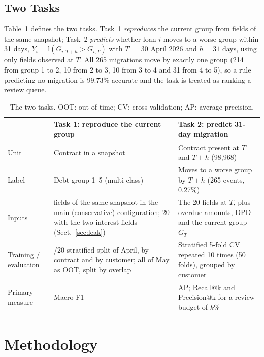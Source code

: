 \documentclass[runningheads]{llncs}
\begin{document}
\subsection{Two Tasks}

Table~\ref{tab:tasks} defines the two tasks. Task~1 \emph{reproduces} the current group from fields of the same snapshot; Task~2 \emph{predicts} whether loan $i$ moves to a worse group within 31 days, $Y_i=\mathbb{I}(G_{i,T+h}>G_{i,T})$ with $T=$ 30 April 2026 and $h=31$ days, using only fields observed at $T$. All 265 migrations move by exactly one group (214 from group 1 to 2, 10 from 2 to 3, 10 from 3 to 4 and 31 from 4 to 5), so a rule predicting no migration is 99.73\% accurate and the task is treated as ranking a review queue.

\begin{table}[t]
\centering
\caption{The two tasks. OOT: out-of-time; CV: cross-validation; AP: average precision.}
\label{tab:tasks}
\scriptsize
\begin{tabular}{@{}>{\raggedright\arraybackslash}p{1.7cm}>{\raggedright\arraybackslash}p{4.6cm}>{\raggedright\arraybackslash}p{5.3cm}@{}}
\toprule
& Task 1: reproduce the current group & Task 2: predict 31-day migration\\
\midrule
Unit & Contract in a snapshot & Contract present at $T$ and $T+h$ (98,968)\\
Label & Debt group 1--5 (multi-class) & Moves to a worse group by $T+h$ (265 events, 0.27\%)\\
Inputs & 18 fields of the same snapshot in the main (conservative) configuration; 20 with the two interest fields (Sect.~\ref{sec:leak}) & The 20 fields at $T$, plus overdue amounts, DPD and the current group $G_T$\\
Training / evaluation & 80/20 stratified split of April, by contract and by customer; all of May as OOT, split by overlap & Stratified 5-fold CV repeated 10 times (50 folds), grouped by customer\\
Primary measure & Macro-F1 & AP; Recall@k and Precision@k for a review budget of $k\%$\\
\bottomrule
\end{tabular}
\end{table}

\section{Methodology}
\label{sec:method}
\end{document}
